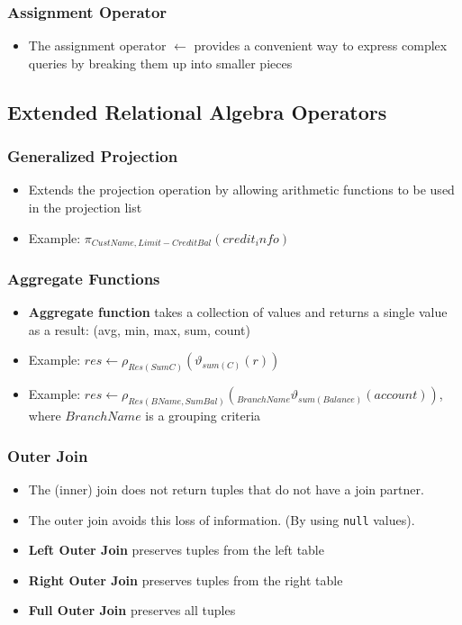 \subsubsection{Assignment Operator}
\begin{itemize}[label=\(\rhd\)]
    \item The assignment operator $\leftarrow$ provides a convenient way to express complex queries by breaking them up into smaller pieces
\end{itemize}

\subsection{Extended Relational Algebra Operators}

\subsubsection{Generalized Projection}
\begin{itemize}[label=\(\rhd\)]
    \item Extends the projection operation by allowing arithmetic functions to be used in the projection list
    \item Example: $\pi_{CustName, Limit - CreditBal}(credit_info)$
\end{itemize}
\subsubsection{Aggregate Functions}
\begin{itemize}[label=\(\rhd\)]
    \item \textbf{Aggregate function} takes a collection of values and returns a single value as a result: (avg, min, max, sum, count)
    \item Example: $res \leftarrow \rho_{Res(SumC)} ( \vartheta _{sum(C)} (r))$
    \item Example: $res \leftarrow \rho_{Res(BName,SumBal)}(_{BranchName} \vartheta_{sum(Balance)}(account))$, where $BranchName$ is a grouping criteria
\end{itemize}
\subsubsection{Outer Join}
\begin{itemize}[label=\(\rhd\)]
    \item The (inner) join does not return tuples that do not have a join partner.
    \item The outer join avoids this loss of information. (By using \texttt{null} values).
    \item \textbf{Left Outer Join} preserves tuples from the left table
    \item \textbf{Right Outer Join} preserves tuples from the right table
    \item \textbf{Full Outer Join} preserves all tuples
\end{itemize}

